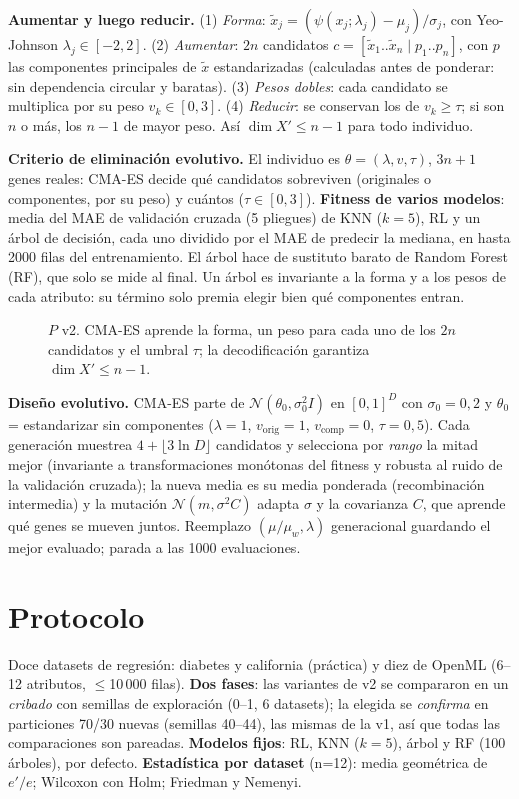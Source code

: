 \documentclass[memoria,twocolumn]{uc3mmaster}
\begin{document}
\textbf{Aumentar y luego reducir.} (1) \emph{Forma}: $\tilde x_j=(\psi(x_j;\lambda_j)-\mu_j)/\sigma_j$, con
Yeo-Johnson $\lambda_j\in[-2,2]$. (2) \emph{Aumentar}: $2n$ candidatos $c=[\tilde x_1..\tilde x_n\mid p_1..p_n]$, con
$p$ las componentes principales de $\tilde x$ estandarizadas (calculadas antes de ponderar: sin dependencia circular y
baratas). (3) \emph{Pesos dobles}: cada candidato se multiplica por su peso $v_k\in[0,3]$. (4) \emph{Reducir}: se
conservan los de $v_k\ge\tau$; si son $n$ o más, los $n-1$ de mayor peso. Así $\dim X'\le n-1$ para todo individuo.

\textbf{Criterio de eliminación evolutivo.} El individuo es $\theta=(\lambda,v,\tau)$, $3n+1$ genes reales: CMA-ES
decide qué candidatos sobreviven (originales o componentes, por su peso) y cuántos ($\tau\in[0,3]$).
\textbf{Fitness de varios modelos}: media del MAE de validación cruzada (5 pliegues) de KNN ($k=5$), RL y un árbol de
decisión, cada uno dividido por el MAE de predecir la mediana, en hasta 2000 filas del entrenamiento. El árbol hace de
sustituto barato de Random Forest (RF), que solo se mide al final. Un árbol es invariante a la forma y a los pesos de
cada atributo: su término solo premia elegir bien qué componentes entran.

\begin{figure}[t]
\centering{}

\caption{$P$ v2. CMA-ES aprende la forma, un peso para cada uno de los $2n$ candidatos y el umbral $\tau$; la
decodificación garantiza $\dim X'\le n-1$.}
\label{fig:esquema}
\end{figure}

\textbf{Diseño evolutivo.} CMA-ES parte de $\mathcal N(\theta_0,\sigma_0^2I)$ en $[0,1]^D$ con $\sigma_0=0{,}2$ y
$\theta_0$ = estandarizar sin componentes ($\lambda=1$, $v_{\text{orig}}=1$, $v_{\text{comp}}=0$, $\tau=0{,}5$).
Cada generación muestrea $4+\lfloor3\ln D\rfloor$ candidatos y selecciona por \emph{rango} la mitad mejor (invariante a
transformaciones monótonas del fitness y robusta al ruido de la validación cruzada); la nueva media es su media
ponderada (recombinación intermedia) y la mutación $\mathcal N(m,\sigma^2C)$ adapta $\sigma$ y la covarianza $C$, que
aprende qué genes se mueven juntos. Reemplazo $(\mu/\mu_w,\lambda)$ generacional guardando el mejor evaluado; parada a
las 1000 evaluaciones.

\section{Protocolo}
Doce datasets de regresión: diabetes y california (práctica) y diez de OpenML (6--12 atributos, $\le$10\,000 filas).
\textbf{Dos fases}: las variantes de v2 se compararon en un \emph{cribado} con semillas de exploración (0--1, 6
datasets); la elegida se \emph{confirma} en particiones 70/30 nuevas (semillas 40--44), las mismas de la v1, así que
todas las comparaciones son pareadas. \textbf{Modelos fijos}: RL, KNN ($k=5$), árbol y RF (100 árboles), por defecto.
\textbf{Estadística por dataset} (n=12): media geométrica de $e'/e$; Wilcoxon con Holm; Friedman y Nemenyi.
\end{document}
